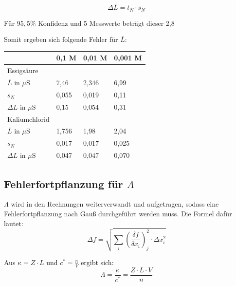 \documentclass[12pt,a4paper,titlepage,headinclude,bibtotoc]{scrartcl}
\begin{document}
\begin{equation}
\Delta \bar{L} = t_N \cdot \bar{s}_N
\end{equation}

Für $95,5 \%$ Konfidenz und 5 Messwerte beträgt dieser 2,8\protect\footnotemark



Somit ergeben sich folgende Fehler für $\bar{L}$:

\begin{table} [h]
\centering 
\begin{tabular}{|p{4cm}||p{2cm}|p{2cm}|p{2cm}|}
\hline
& 0,1 M & 0,01 M & 0,001 M \\
\hline
Essigsäure & & & \\
$\bar{L}$ in $\mu \mathrm{S}$ &7,46 & 2,346 & 6,99\\
$s_N$ & 0,055 & 0,019 & 0,11 \\
$\Delta L$ in $\mu \mathrm{S}$ & 0,15& 0,054& 0,31\\
\hline
Kaliumchlorid & & &\\
$\bar{L}$ in $\mu \mathrm{S}$& 1,756 & 1,98 & 2,04\\
$s_N$& 0,017 & 0,017 & 0,025\\
$\Delta L$ in $\mu \mathrm{S}$ & 0,047& 0,047& 0,070\\
\hline
\end{tabular}
\end{table}

\newpage
\subsection{Fehlerfortpflanzung für $\Lambda$}
$\Lambda$ wird in den Rechnungen weiterverwandt und aufgetragen, sodass eine Fehlerfortpflanzung nach Gauß durchgeführt werden muss. Die Formel dafür lautet:\\

\begin{equation}
\Delta f = \sqrt{\sum_i \left(\frac{\delta f}{\delta x_i}\right)^2_j \cdot \Delta x_i^2}
\end{equation}

Aus $\kappa = Z \cdot L$ und $c^* =\frac{n}{V}$ ergibt sich:\\

\begin{equation}
\Lambda = \frac{\kappa}{c^*}= \frac{Z \cdot L \cdot V}{n}
\end{equation}
\end{document}

